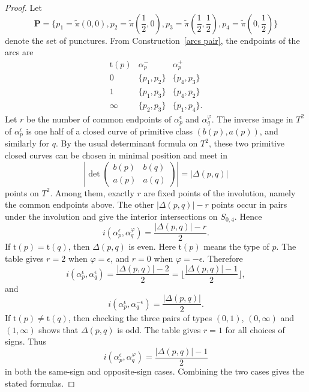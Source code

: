 \documentclass[11pt,a4paper,reqno]{amsart}%
\theoremstyle{plain}
\theoremstyle{definition}
\numberwithin{equation}{section}
\numberwithin{equation}{section}
\newcommand{\typ}[1]{\mathrm{t}(#1)}%
\renewcommand\P{\mathbf{P}} %
\begin{document}
\begin{proof}
Let
$$\P=\{p_1=\tilde{\pi}(0,0),p_2=\tilde{\pi}(\frac{1}{2},0),p_3=\tilde{\pi}(\frac{1}{2},\frac{1}{2}),p_4=\tilde{\pi}(0,\frac{1}{2})\}$$
  denote the set of punctures.
From Construction~\ref{arcs pair}, the endpoints of the arcs are
$$\begin{array}{c|cc}
\typ{p} & \alpha_p^- & \alpha_p^+\\ \hline
0 & \{p_1,p_2\} & \{p_4,p_3\}\\
1 & \{p_1,p_3\} & \{p_4,p_2\}\\
\infty & \{p_2,p_3\} & \{p_1,p_4\}.
\end{array}$$
Let $r$ be the number of common endpoints of $\alpha_p^\epsilon$ and $\alpha_q^\varphi$. The inverse image in $T^2$ of $\alpha_p^\epsilon$ is one half of a closed curve of primitive class $(b(p),a(p))$, and similarly for $q$. By the usual determinant formula on $T^2$, these two primitive closed curves can be chosen in minimal position and meet in
$$\left|\det\begin{pmatrix} b(p)&b(q)\\ a(p)&a(q)\end{pmatrix}\right|=|\Delta(p,q)|$$
points on $T^2$. Among them, exactly $r$ are fixed points of the involution, namely the common endpoints above. The other $|\Delta(p,q)|-r$ points occur in pairs under the involution and give the interior intersections on $S_{0,4}$. Hence
$$i(\alpha_p^\epsilon,\alpha_q^\varphi)=\frac{|\Delta(p,q)|-r}{2}.$$
If $\typ{p}=\typ{q}$, then $\Delta(p,q)$ is even. Here $\typ{p}$ means the type of $p$. The table gives $r=2$ when $\varphi=\epsilon$, and $r=0$ when $\varphi=-\epsilon$. Therefore
$$i(\alpha_p^\epsilon,\alpha_q^\epsilon)=\frac{|\Delta(p,q)|-2}{2}= \lfloor\frac{|\Delta(p,q)|-1}{2}\rfloor,$$
and
$$i(\alpha_p^\epsilon,\alpha_q^{-\epsilon})=\frac{|\Delta(p,q)|}{2}.$$
If $\typ{p}\ne\typ{q}$, then checking the three pairs of types $(0,1)$, $(0,\infty)$ and $(1,\infty)$ shows that $\Delta(p,q)$ is odd. The table gives $r=1$ for all choices of signs. Thus
$$i(\alpha_p^\epsilon,\alpha_q^\varphi)=\frac{|\Delta(p,q)|-1}{2}$$
in both the same-sign and opposite-sign cases. Combining the two cases gives the stated formulas.
\end{proof}
\end{document}
